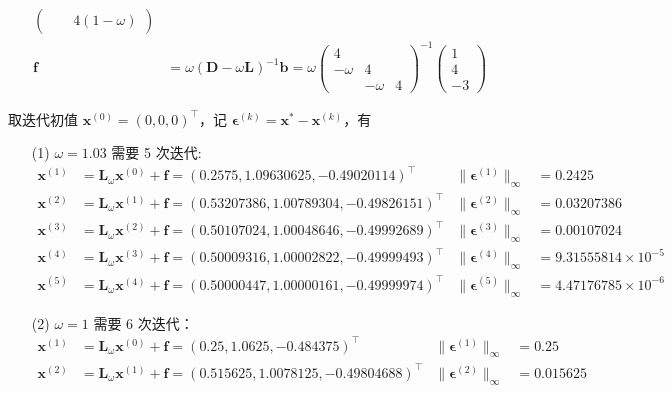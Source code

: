 \documentclass{sjtuarticle}
\begin{document}
\begin{itemize}
\begin{solution}
\begin{align*}
\begin{pmatrix}
                & & 4(1-\omega)
            \end{pmatrix} \\
            \bm{f}&=\omega(\bm{D}-\omega\bm{L})^{-1}\bm{b}=\omega\begin{pmatrix}
                4 \\ -\omega & 4 \\ & -\omega & 4
            \end{pmatrix}^{-1}\begin{pmatrix}
                1\\4\\-3
            \end{pmatrix}
        \end{align*}

        取迭代初值 $\bm{x}^{(0)}=(0,0,0)^\top$，记 $\bm{\epsilon}^{(k)}=\bm{x}^{*}-\bm{x}^{(k)}$，有
        \begin{enumerate}
            \item[(1)]$\omega=1.03$ 需要 5 次迭代:
            \begin{align*}
    \bm{x}^{(1)}&=\bm{L}_{\omega}\bm{x}^{(0)}+\bm{f}=\left(0.2575, 1.09630625, -0.49020114\right)^\top & \lVert\bm{\epsilon}^{(1)}\rVert_{\infty}&=0.2425 \\
\bm{x}^{(2)}&=\bm{L}_{\omega}\bm{x}^{(1)}+\bm{f}=\left(0.53207386, 1.00789304, -0.49826151\right)^\top & \lVert\bm{\epsilon}^{(2)}\rVert_{\infty}&=0.03207386 \\
\bm{x}^{(3)}&=\bm{L}_{\omega}\bm{x}^{(2)}+\bm{f}=\left(0.50107024, 1.00048646, -0.49992689\right)^\top & \lVert\bm{\epsilon}^{(3)}\rVert_{\infty}&=0.00107024 \\
\bm{x}^{(4)}&=\bm{L}_{\omega}\bm{x}^{(3)}+\bm{f}=\left(0.50009316, 1.00002822, -0.49999493\right)^\top & \lVert\bm{\epsilon}^{(4)}\rVert_{\infty}&=9.31555814\times 10^{-5} \\
\bm{x}^{(5)}&=\bm{L}_{\omega}\bm{x}^{(4)}+\bm{f}=\left(0.50000447, 1.00000161, -0.49999974\right)^\top & \lVert\bm{\epsilon}^{(5)}\rVert_{\infty}&=4.47176785\times 10^{-6} 
            \end{align*}
            \item[(2)] $\omega=1$ 需要 6 次迭代：
\begin{align*}
\bm{x}^{(1)}&=\bm{L}_{\omega}\bm{x}^{(0)}+\bm{f}=\left(0.25, 1.0625, -0.484375\right)^\top & \lVert\bm{\epsilon}^{(1)}\rVert_{\infty}&=0.25 \\
\bm{x}^{(2)}&=\bm{L}_{\omega}\bm{x}^{(1)}+\bm{f}=\left(0.515625, 1.0078125, -0.49804688\right)^\top & \lVert\bm{\epsilon}^{(2)}\rVert_{\infty}&=0.015625 \\

\end{align*}
\end{enumerate}
\end{solution}
\end{itemize}
\end{document}
